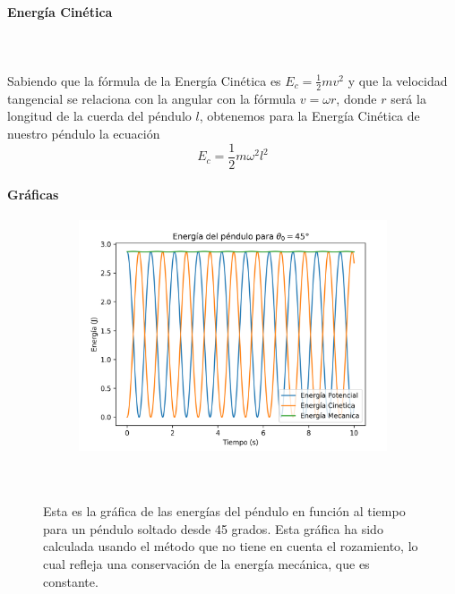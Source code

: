 \documentclass{article}
\begin{document}
        \paragraph{Energía Cinética}\mbox{}\\\\
            Sabiendo que la fórmula de la Energía Cinética es $E_{c} = \frac{1}{2} m v^2$ y que la velocidad tangencial se relaciona con la angular con la fórmula $v = \omega r$, donde $r$ será la longitud de la cuerda del péndulo $l$, obtenemos para la Energía Cinética de nuestro péndulo la ecuación \\\[ \boxed{E_{c} = \frac{1}{2} m \omega^{2} l^{2}}\]


\paragraph{Gráficas}\mbox{}

\begin{figure}[h]
\begin{figure}
\centering
\includegraphics[width=.55\textwidth]{fotos/Fig5.png}
\end{figure}
\hfill \break \\\\
Esta es la gráfica de las energías del péndulo en función al tiempo para un péndulo soltado desde 45 grados. Esta gráfica ha sido calculada usando el método que no tiene en cuenta el rozamiento, lo cual refleja una conservación de la energía mecánica, que es constante.
\end{figure}

\hfill \break \\
\end{document}
